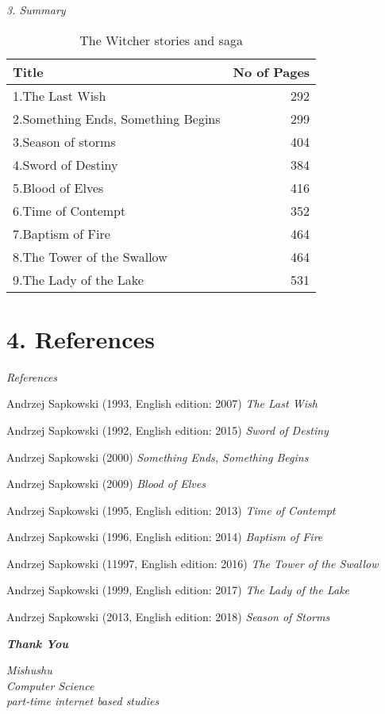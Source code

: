 \documentclass[xcolor=dvipsnames]{beamer}
\begin{document}
\begin{frame}{\textit{3. Summary}}

\begin{table}
\centering
\begin{tabular}{l|r}
Title & No of Pages \\\hline
1.The Last Wish & 292 \\
2.Something Ends, Something Begins & 299 \\
3.Season of storms & 404 \\
4.Sword of Destiny & 384 \\
5.Blood of Elves & 416 \\
6.Time of Contempt & 352  \\
7.Baptism of Fire & 464 \\
8.The Tower of the Swallow & 464 \\
9.The Lady of the Lake & 531 \\
\end{tabular}
\caption{\label{tab:widgets}The Witcher stories and saga}
\end{table}
    
\end{frame}

\section{4. References}
\begin{frame}[allowframebreaks]{\textit{References}}
    \begin{thebibliography}{9}
Andrzej Sapkowski (1993, English edition: 2007) 
\emph{The Last Wish}

Andrzej Sapkowski (1992, English edition: 2015) 
\emph{Sword of Destiny}

Andrzej Sapkowski (2000) 
\emph{Something Ends, Something Begins}

Andrzej Sapkowski (2009) 
\emph{Blood of Elves}

Andrzej Sapkowski (1995, English edition: 2013) 
\emph{Time of Contempt}

Andrzej Sapkowski (1996, English edition: 2014) 
\emph{Baptism of Fire}

Andrzej Sapkowski (11997, English edition: 2016) 
\emph{The Tower of the Swallow}

Andrzej Sapkowski (1999, English edition: 2017) 
\emph{The Lady of the Lake}

Andrzej Sapkowski (2013, English edition: 2018) 
\emph{Season of Storms}

\end{thebibliography}
\end{frame}

\begin{frame}
\begin{center}
    \fontsize{18}{20}\color{GECBlue}\textbf{\textit{Thank You}}

\vspace{2cm}

\begin{flushleft}
\textit{Mishushu \\
Computer Science \\
part-time internet based studies  \\
}
\end{flushleft}
    
\end{center}
\end{frame}
\end{document}
